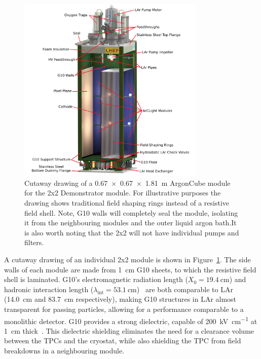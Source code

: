 \begin{figure}[tbp]
  \centering
  \includegraphics[width=0.8\textwidth]{plots/Normal-Module-4K_labelled}
  \caption[ArgonCube module engineering drawing]{Cutaway drawing of a \SI{0.67 x 0.67 x 1.81}{\metre} ArgonCube module for the 2x2 Demonstrator module. For illustrative purposes the drawing shows traditional field shaping rings instead of a resistive field shell. Note, G10 walls will completely seal the module, isolating it from the neighbouring modules and the outer liquid argon bath.It is also worth noting that the 2x2 will not have individual pumps and filters.}
  \label{fig:ac_module}
\end{figure}

A cutaway drawing of an individual 2x2 module is shown in Figure~\ref{fig:ac_module}. The side walls of each module are made from \SI{1}{\centi\metre} G10 sheets, to which the resistive field shell is laminated. G10's electromagnetic radiation length ($X_{\mathrm{0}} = \SI{19.4}{\centi\metre}$) and hadronic interaction length ($\lambda_{\mathrm{int}} = \SI{53.1}{\centi\metre}$)~\cite{pdg_g10} are both comparable to LAr (14.0~cm and 83.7~cm respectively), making G10 structures in LAr almost transparent for passing particles, allowing for a performance comparable to a monolithic detector. G10 provides a strong dielectric, capable of \SI{200}{\kilo\volt\per\centi\metre} at \SI{1}{\centi\metre} thick~\cite{G10Breakdown}. This dielectric shielding eliminates the need for a clearance volume between the TPCs and the cryostat, while also shielding the TPC from field breakdowns in a neighbouring module. 

